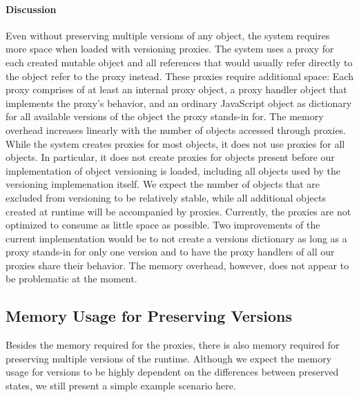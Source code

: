 \paragraph{Discussion}
Even without preserving multiple versions of any object, the system requires more space when loaded with versioning proxies.
The system uses a proxy for each created mutable object and all references that would usually refer directly to the object refer to the proxy instead.
These proxies require additional space: Each proxy comprises of at least an internal proxy object, a proxy handler object that implements the proxy's behavior, and an ordinary JavaScript object as dictionary for all available versions of the object the proxy stands-in for.
The memory overhead increases linearly with the number of objects accessed through proxies.
While the system creates proxies for most objects, it does not use proxies for all objects.
In particular, it does not create proxies for objects present before our implementation of object versioning is loaded, including all objects used by the versioning implemenation itself.
We expect the number of objects that are excluded from versioning to be relatively stable, while all additional objects created at runtime will be accompanied by proxies.
Currently, the proxies are not optimized to consume as little space as possible.
Two improvements of the current implementation would be to not create a versions dictionary as long as a proxy stands-in for only one version and to have the proxy handlers of all our proxies share their behavior.
The memory overhead, however, does not appear to be problematic at the moment.


\subsection{Memory Usage for Preserving Versions}

Besides the memory required for the proxies, there is also memory required for preserving multiple versions of the runtime.
Although we expect the memory usage for versions to be highly dependent on the differences between preserved states, we still present a simple example scenario here.

